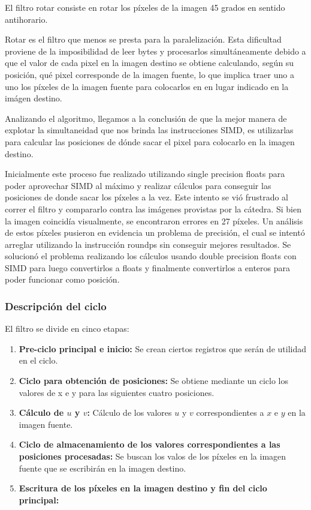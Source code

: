 El filtro rotar consiste en rotar los píxeles de la imagen 45 grados en sentido antihorario.

Rotar es el filtro que menos se presta para la paralelización. Esta dificultad proviene de la imposibilidad de leer bytes y procesarlos simultáneamente debido a que el valor de cada pixel en la imagen destino se obtiene calculando, según su posición, qué pixel corresponde de la imagen fuente, lo que implica traer uno a uno los píxeles de la imagen fuente para colocarlos en en lugar indicado en la imágen destino.

Analizando el algoritmo, llegamos a la conclusión de que la mejor manera de explotar la simultaneidad que nos brinda las instrucciones SIMD, es utilizarlas para calcular las posiciones de dónde sacar el pixel para colocarlo en la imagen destino. 

Inicialmente este proceso fue realizado utilizando single precision floats para poder aprovechar SIMD al máximo y realizar cálculos para conseguir las posiciones de donde sacar los píxeles a la vez. Este intento se vió frustrado al correr el filtro y compararlo contra las imágenes provistas por la cátedra. Si bien la imagen coincidía visualmente, se encontraron errores en 27 píxeles. Un análisis de estos píxeles pusieron en evidencia un problema de precisión, el cual se intentó arreglar utilizando la instrucción roundps sin conseguir mejores resultados. Se solucionó el problema realizando los cálculos usando double precision floats con SIMD para luego convertirlos a floats y finalmente convertirlos a enteros para poder funcionar como posición.


\subsubsection{Descripción del ciclo}

El filtro se divide en cinco etapas:

\begin{enumerate}
\item \textbf{Pre-ciclo principal e inicio:} Se crean ciertos registros que serán de utilidad en el ciclo.
\item \textbf{Ciclo para obtención de posiciones:} Se obtiene mediante un ciclo los valores de x e y para las siguientes cuatro posiciones.
\item \textbf{Cálculo de $u$ y $v$:} Cálculo de los valores $u$ y $v$ correspondientes a $x$ e $y$ en la imagen fuente.
\item \textbf{Ciclo de almacenamiento de los valores correspondientes a las posiciones procesadas:} Se buscan los valos de los píxeles en la imagen fuente que se escribirán en la imagen destino.
\item \textbf{Escritura de los píxeles en la imagen destino y fin del ciclo principal:}
\end{enumerate}


